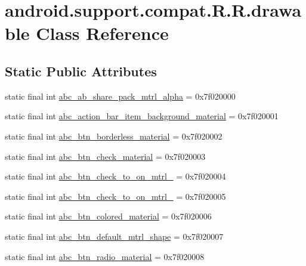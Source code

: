 \hypertarget{classandroid_1_1support_1_1compat_1_1_r_1_1drawable}{
\section{android.support.compat.R.R.drawable Class Reference}
\label{classandroid_1_1support_1_1compat_1_1_r_1_1drawable}
}
\subsection*{Static Public Attributes}
\begin{CompactItemize}
\item 
static final int \hyperlink{classandroid_1_1support_1_1compat_1_1_r_1_1drawable_37243e447f9f0a3cabf2459ed11959b6}{abc\_\-ab\_\-share\_\-pack\_\-mtrl\_\-alpha} = 0x7f020000
\item 
static final int \hyperlink{classandroid_1_1support_1_1compat_1_1_r_1_1drawable_4ae39da5add2b40e5eeaa66069cd67c1}{abc\_\-action\_\-bar\_\-item\_\-background\_\-material} = 0x7f020001
\item 
static final int \hyperlink{classandroid_1_1support_1_1compat_1_1_r_1_1drawable_e3e5eaed5f6462c8691189d207fbe451}{abc\_\-btn\_\-borderless\_\-material} = 0x7f020002
\item 
static final int \hyperlink{classandroid_1_1support_1_1compat_1_1_r_1_1drawable_dc91443fa57b6bf3b9be8d42617055c1}{abc\_\-btn\_\-check\_\-material} = 0x7f020003
\item 
static final int \hyperlink{classandroid_1_1support_1_1compat_1_1_r_1_1drawable_789b3a9f7a17d9ead716ec81d4616dbe}{abc\_\-btn\_\-check\_\-to\_\-on\_\-mtrl\_} = 0x7f020004
\item 
static final int \hyperlink{classandroid_1_1support_1_1compat_1_1_r_1_1drawable_8d4be52f9d49fff8b832d75a94735ad9}{abc\_\-btn\_\-check\_\-to\_\-on\_\-mtrl\_} = 0x7f020005
\item 
static final int \hyperlink{classandroid_1_1support_1_1compat_1_1_r_1_1drawable_f682724e27629bf8ae33559fc195c255}{abc\_\-btn\_\-colored\_\-material} = 0x7f020006
\item 
static final int \hyperlink{classandroid_1_1support_1_1compat_1_1_r_1_1drawable_51d85b61be89b7fba15253fea64c6101}{abc\_\-btn\_\-default\_\-mtrl\_\-shape} = 0x7f020007
\item 
static final int \hyperlink{classandroid_1_1support_1_1compat_1_1_r_1_1drawable_84ac1d104134079ab7009267babd7879}{abc\_\-btn\_\-radio\_\-material} = 0x7f020008

\end{CompactItemize}
